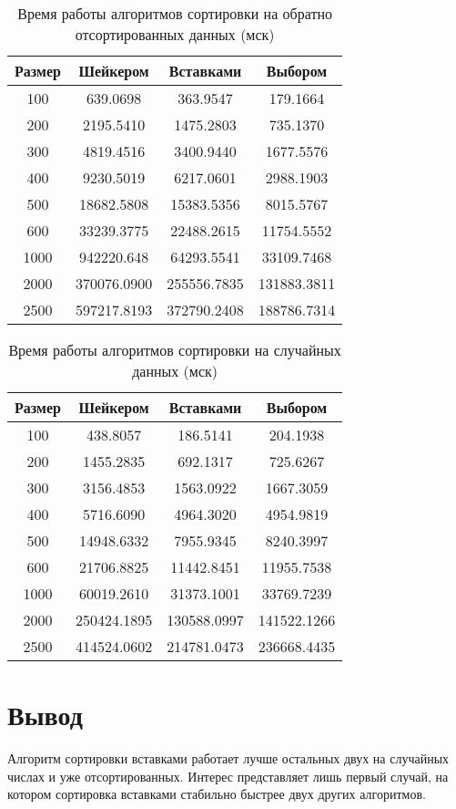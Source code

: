 \begin{table}[h]
	\begin{center}
		\caption{ Время работы алгоритмов сортировки на обратно	отсортированных данных (мск)}
		\label{tbl:wor}
		\begin{tabular}{|c|c|c|c|}
			\hline
			Размер & Шейкером &  Вставками &  Выбором \\
			\hline
			100 & 639.0698 & 363.9547 & 179.1664\\
			\hline
			200 & 2195.5410 & 1475.2803 & 735.1370 \\
			\hline
			300 & 4819.4516 & 3400.9440 & 1677.5576 \\
			\hline
			400 & 9230.5019 & 6217.0601 & 2988.1903 \\
			\hline
			500 & 18682.5808 & 15383.5356 & 8015.5767 \\
			\hline
			600 & 33239.3775 & 22488.2615 & 11754.5552 \\
			\hline
			1000 & 942220.648 & 64293.5541 & 33109.7468 \\
			\hline
			2000 & 370076.0900 & 255556.7835 & 131883.3811 \\
			\hline
			2500 & 597217.8193 & 372790.2408 & 188786.7314 \\
			\hline
		\end{tabular}
	\end{center}
	
\end{table}
\clearpage


\begin{table}[h]
	\begin{center}
		\caption{ Время работы алгоритмов сортировки на случайных данных (мск)}
		\label{tbl:random}
		\begin{tabular}{|c|c|c|c|}
			\hline
			Размер & Шейкером&  Вставками  &  Выбором \\
			\hline
			100 & 438.8057  & 186.5141 & 204.1938\\
			\hline
			200 & 1455.2835  & 692.1317& 725.6267 \\
			\hline
			300 & 3156.4853  & 1563.0922& 1667.3059 \\
			\hline
			400 & 5716.6090  & 4964.3020& 4954.9819 \\
			\hline
			500 & 14948.6332 & 7955.9345  & 8240.3997\\
			\hline
			600 & 21706.8825 & 11442.8451  & 11955.7538\\
			\hline
			1000 & 60019.2610  & 31373.1001 & 33769.7239\\
			\hline
			2000 & 250424.1895 & 130588.0997  & 141522.1266\\
			\hline
			2500 & 414524.0602 & 214781.0473  & 236668.4435\\
			\hline
		\end{tabular}
	\end{center}
	
\end{table}
\clearpage

\section*{Вывод}

Алгоритм сортировки вставками работает лучше остальных двух на случайных числах и уже отсортированных. Интерес представляет лишь первый случай, на котором сортировка вставками стабильно быстрее двух других алгоритмов.


